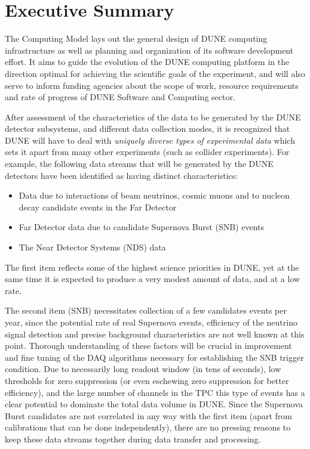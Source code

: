 \section{Executive Summary}
The Computing Model lays out the general design of DUNE computing infrastructure as well as planning and
organization of its software development effort. It aims to guide the evolution of the DUNE computing
platform in the direction optimal for achieving the scientific goals of the experiment, and will also serve
to inform funding agencies about the scope of work, resource requirements and rate of progress of 
DUNE Software and Computing sector.

After assessment of the characteristics of the data to be generated by the DUNE detector subsystems,
and different data collection modes, it is recognized that DUNE will have to deal with \textit{uniquely diverse
types of experimental data} which sets it apart from many other experiments (such as collider experiments). 
For example, the following data streams that will be generated by the DUNE detectors have been identified
as having distinct characteristics:
\begin{itemize}

\item Data due to interactions of beam neutrinos, cosmic muons and to nucleon decay candidate events in the Far Detector

\item Far Detector data due to candidate Supernova Burst (SNB) events

\item The Near Detector Systems (NDS) data

\end{itemize}

\noindent
The first item reflects some of the highest science priorities in DUNE, yet at the same time it is expected
to produce a very modest amount of data, and at a low rate.

The second item (SNB) necessitates collection of a few candidates
events per year, since the potential rate of real Supernova events, efficiency of the neutrino signal detection
and precise background characteristics are not well known at this point. Thorough understanding of these factors will be crucial
in improvement and fine tuning of the DAQ algorithms necessary for establishing the SNB trigger condition.
Due to necessarily long readout window (in tens of seconds), low thresholds for zero suppression (or even
eschewing zero suppression for better efficiency), and the large number of channels in the TPC this type of events
has a clear potential to dominate the total data volume in DUNE. Since the Supernova Burst candidates are not correlated
in any way with the first item (apart from calibrations that can be done independently), there are no pressing reasons to keep
these data streams together during data transfer and processing.

